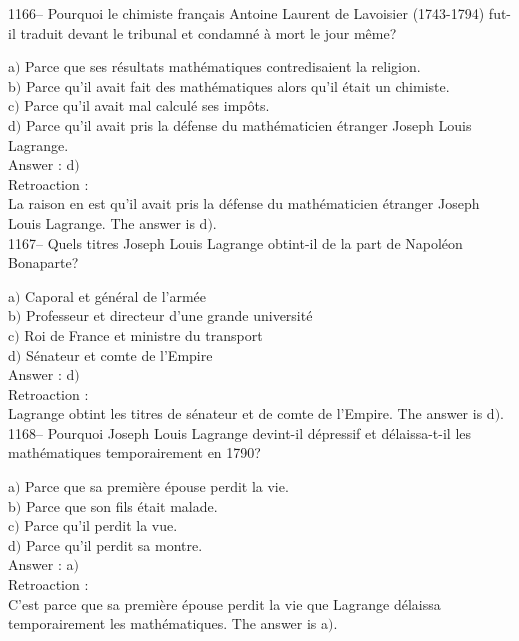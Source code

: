 ﻿\documentclass[letterpaper, 12pt]{article}
\begin{document}
1166-- Pourquoi le chimiste fran\c cais Antoine Laurent de Lavoisier
(1743-1794) fut-il traduit devant le tribunal et condamn\'e \`a mort
le jour m\^eme?

a$)$ Parce que ses r\'esultats math\'ematiques contredisaient la religion.
\\
b$)$ Parce qu'il avait fait des math\'ematiques alors qu'il \'etait un
chimiste. \\
c$)$ Parce qu'il avait mal calcul\'e ses imp\^ots. \\
d$)$ Parce qu'il avait pris la d\'efense du math\'ematicien \'etranger
Joseph Louis Lagrange.\\

Answer : d$)$\\

Retroaction : \\
La raison en est qu'il avait pris la d\'efense du math\'ematicien
\'etranger Joseph Louis Lagrange.
The answer is d$)$.\\

1167-- Quels titres Joseph Louis Lagrange obtint-il de la part de
Napol\'eon Bonaparte?

a$)$ Caporal et g\'en\'eral de l'arm\'ee \\
b$)$ Professeur et directeur d'une grande universit\'e \\
c$)$ Roi de France et ministre du transport \\
d$)$ S\'enateur et comte de l'Empire\\

Answer : d$)$\\

Retroaction : \\
Lagrange obtint les titres de s\'enateur et de comte de l'Empire.
The answer is d$)$.\\

1168-- Pourquoi Joseph Louis Lagrange devint-il d\'epressif et
d\'elaissa-t-il les math\'ematiques temporairement en 1790?

a$)$ Parce que sa premi\`ere \'epouse perdit la vie. \\
b$)$ Parce que son fils \'etait malade. \\
c$)$ Parce qu'il perdit la vue. \\
d$)$ Parce qu'il perdit sa montre.\\

Answer : a$)$\\

Retroaction : \\
C'est parce que sa premi\`ere \'epouse perdit la vie que Lagrange
d\'elaissa temporairement les math\'ematiques.
The answer is a$)$.\\
\end{document}
